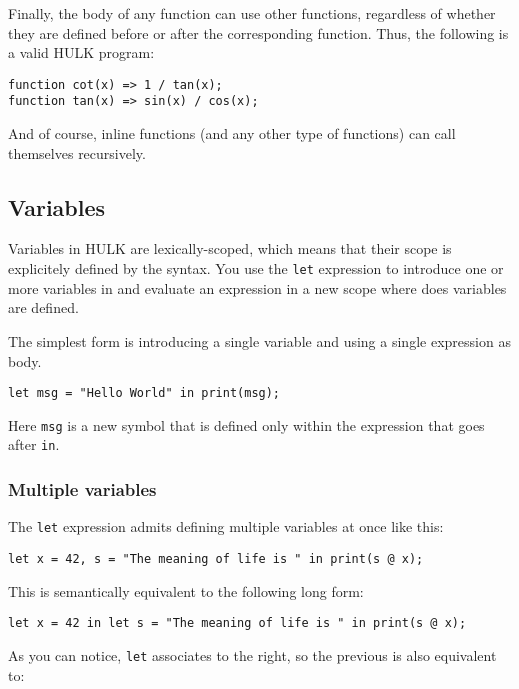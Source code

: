 \documentclass[a4paper, 12pt]{report}
\begin{document}
Finally, the body of any function can use other functions, regardless of whether they are defined before or after the corresponding function.
Thus, the following is a valid HULK program:

\begin{lstlisting}
function cot(x) => 1 / tan(x);
function tan(x) => sin(x) / cos(x);
\end{lstlisting}


And of course, inline functions (and any other type of functions) can call themselves recursively.

\subsection*{Variables}

Variables in HULK are lexically-scoped, which means that their scope is explicitely defined by the syntax. 
You use the {\tt let} expression to introduce one or more variables in and evaluate an expression in 
a new scope where does variables are defined.

The simplest form is introducing a single variable and using a single expression as body.

\begin{lstlisting}
let msg = "Hello World" in print(msg);
\end{lstlisting}

Here {\tt msg} is a new symbol that is defined only within the expression that goes after {\tt in}.

\subsubsection*{Multiple variables}

The {\tt let} expression admits defining multiple variables at once like this:

\begin{lstlisting}
let x = 42, s = "The meaning of life is " in print(s @ x);
\end{lstlisting}

This is semantically equivalent to the following long form:

\begin{lstlisting}
let x = 42 in let s = "The meaning of life is " in print(s @ x); 
\end{lstlisting}

As you can notice, {\tt let} associates to the right, so the previous is also equivalent to:
\end{document}
